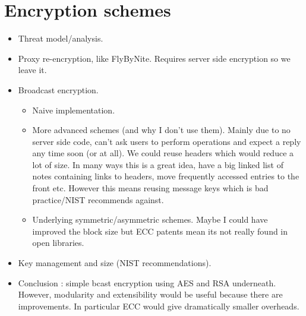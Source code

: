 \section{Encryption schemes}
    \begin{itemize}
        \item Threat model/analysis.
        \item Proxy re-encryption, like FlyByNite. Requires server side encryption so we leave it.
        \item Broadcast encryption.
        \begin{itemize}
            \item Naive implementation.
            \item More advanced schemes (and why I don't use them). Mainly due to no server side code, can't ask users to perform operations and expect a reply any time soon (or at all). We could reuse headers which would reduce a lot of size. In many ways this is a great idea, have a big linked list of notes containing links to headers, move frequently accessed entries to the front etc. However this means reusing message keys which is bad practice/NIST recommends against.
            \item Underlying symmetric/asymmetric schemes. Maybe I could have improved the block size but ECC patents mean its not really found in open libraries.
        \end{itemize}
	\item Key management and size (NIST recommendations).
        \item Conclusion : simple bcast encryption using AES and RSA underneath. However, modularity and extensibility would be useful because there are improvements. In particular ECC would give dramatically smaller overheads. 
    \end{itemize}


